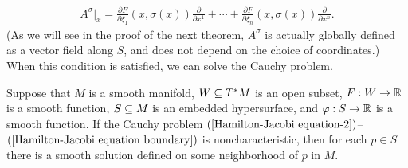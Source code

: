 \begin{align}\label{Hamilton-Jacobi equation vector field}
A^\sigma|_x=\frac{\partial F}{\partial\xi_1}(x,\sigma(x))\frac{\partial}{\partial x^1}+\cdots+\frac{\partial F}{\partial\xi_n}(x,\sigma(x))\frac{\partial}{\partial x^n}.
\end{align}
(As we will see in the proof of the next theorem, $A^\sigma$ is actually globally defined as a vector field along $S$, and does not depend on the choice of coordinates.) When this condition is satisfied, we can solve the Cauchy problem.
\begin{theorem}\label{Hamilton-Jacobi equation solution}
Suppose that $M$ is a smooth manifold, $W\subseteq T^*M$ is an open subset, $F:W\to\mathbb{R}$ is a smooth function, $S\subseteq M$ is an embedded hypersurface, and $\varphi:S\to\mathbb{R}$ is a smooth function. If the Cauchy problem $(\ref{Hamilton-Jacobi equation-2})$--$(\ref{Hamilton-Jacobi equation boundary})$ is noncharacteristic, then for each $p\in S$ there is a smooth solution defined on some neighborhood of $p$ in $M$.
\end{theorem}
